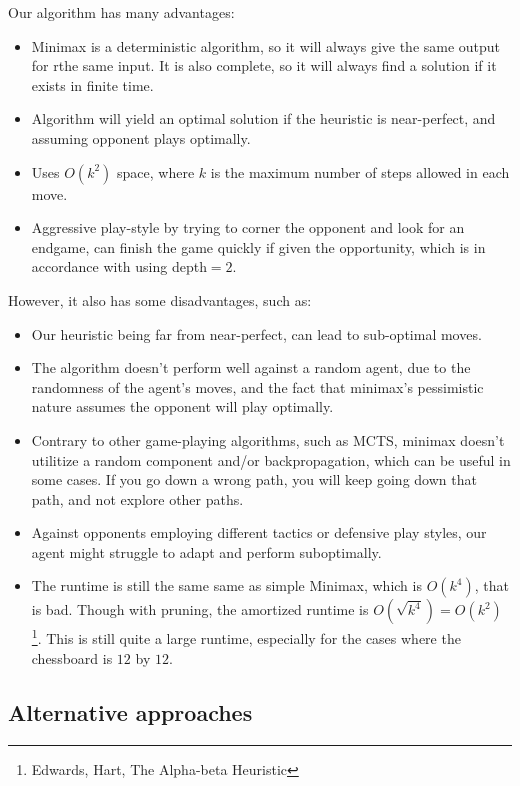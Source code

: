 \documentclass[11pt]{article}
\begin{document}
Our algorithm has many advantages:

\begin{itemize}
    \item Minimax is a deterministic algorithm, so it will always give the same output for rthe same input. It is also complete, so it will always find a solution if it exists in finite time.
    \item Algorithm will yield an optimal solution if the heuristic is near-perfect, and assuming opponent plays optimally.
    \item Uses $O(k^2)$ space, where $k$ is the maximum number of steps allowed in each move.
    \item Aggressive play-style by trying to corner the opponent and look for an endgame, can finish the game quickly if given the opportunity, which is in accordance with using depth$=2$.
\end{itemize}

However, it also has some disadvantages, such as:

\begin{itemize}
    \item Our heuristic being far from near-perfect, can lead to sub-optimal moves.
    \item The algorithm doesn't perform well against a random agent, due to the randomness of the agent's moves, and the fact that minimax's pessimistic nature assumes the opponent will play optimally.
    \item Contrary to other game-playing algorithms, such as MCTS, minimax doesn't utilitize a random component and/or backpropagation, which can be useful in some cases. If you go down a wrong path, you will keep going down that path, and not explore other paths.
    \item Against opponents employing different tactics or defensive play styles, our agent might struggle to adapt and perform suboptimally.
    \item The runtime is still the same same as simple Minimax, which is $O(k^4)$, that is bad. Though with pruning, the amortized runtime is $O(\sqrt{k^4}) =  O(k^2)$\footnote[2]{Edwards, Hart, The Alpha-beta Heuristic}. This is still quite a large runtime, especially for the cases where the chessboard is $12$ by $12$.
\end{itemize}

\subsection{Alternative approaches}
\end{document}
